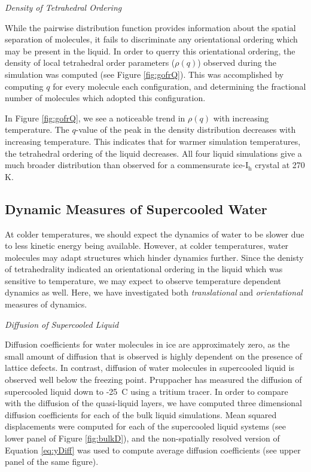 \begin{flushleft}
\textit{Density of Tetrahedral Ordering}
\end{flushleft}

While the pairwise distribution function provides information about
the spatial separation of molecules, it fails to discriminate any
orientational ordering which may be present in the liquid. In order to
querry this orientational ordering, the density of local tetrahedral
order parameters ($\rho (q)$) observed during the simulation was
computed (see Figure \ref{fig:gofrQ}). This was accomplished by
computing $q$ for every molecule each configuration, and determining
the fractional number of molecules which adopted this configuration.

In Figure \ref{fig:gofrQ}, we see a noticeable trend in $\rho (q)$
with increasing temperature. The $q$-value of the peak in the density
distribution decreases with increasing temperature. This indicates
that for warmer simulation temperatures, the tetrahedral ordering of
the liquid decreases. All four liquid simulations give a much broader
distribution than observed for a commensurate ice-I$_\mathrm{h}$
crystal at 270 K.





\subsection{Dynamic Measures of Supercooled Water}
At colder temperatures, we should expect the dynamics of water to be
slower due to less kinetic energy being available. However, at colder
temperatures, water molecules may adapt structures which hinder
dynamics further. Since the denisty of tetrahedrality indicated an
orientational ordering in the liquid which was sensitive to
temperature, we may expect to observe temperature dependent dynamics
as well. Here, we have investigated both \textit{translational} and
\textit{orientational} measures of dynamics.

\begin{flushleft}
\textit{Diffusion of Supercooled Liquid}
\end{flushleft}

Diffusion coefficients for water molecules in ice are approximately
zero, as the small amount of diffusion that is observed is highly
dependent on the presence of lattice defects. In contrast, diffusion
of water molecules in supercooled liquid is observed well below the
freezing point.\cite{Debenedetti2003} Pruppacher has measured the
diffusion of supercooled liquid down to -25\degree~C using a tritium
tracer.\cite{Pruppacher1972} In order to compare with the diffusion of
the quasi-liquid layers, we have computed three dimensional diffusion
coefficients for each of the bulk liquid simulations. Mean squared
displacements were computed for each of the supercooled liquid systems
(see lower panel of Figure \ref{fig:bulkD}), and the non-spatially
resolved version of Equation \eqref{eq:yDiff} was used to compute
average diffusion coefficients (see upper panel of the same figure).

